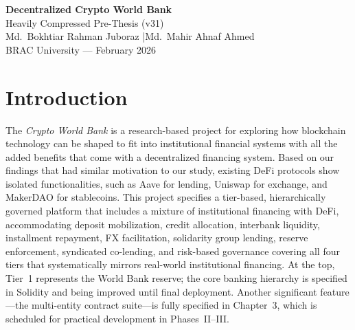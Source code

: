 \documentclass[12pt, a4paper]{report}
\begin{document}
\thispagestyle{empty}
\begin{center}
\vspace*{2cm}
{\LARGE\bfseries Decentralized Crypto World Bank}\\[0.5em]
{\large Heavily Compressed Pre-Thesis (v31)}\\[1.5em]
{\normalsize Md.\ Bokhtiar Rahman Juboraz \quad|\quad Md.\ Mahir Ahnaf Ahmed}\\[0.5em]
{\small BRAC University --- February 2026}
\end{center}
\newpage

\setcounter{page}{1}
\tableofcontents
\newpage
\listoffigures
\newpage
{}
\setcounter{page}{1}

\chapter{Introduction}
\label{sec:intro}

The \textit{Crypto World Bank} is a research-based project for exploring how blockchain technology can be shaped to fit into institutional financial systems with all the added benefits that come with a decentralized financing system. Based on our findings that had similar motivation to our study, existing DeFi protocols show isolated functionalities, such as Aave for lending, Uniswap for exchange, and MakerDAO for stablecoins. This project specifies a tier-based, hierarchically governed platform that includes a mixture of institutional financing with DeFi, accommodating deposit mobilization, credit allocation, interbank liquidity, installment repayment, FX facilitation, solidarity group lending, reserve enforcement, syndicated co-lending, and risk-based governance covering all four tiers that systematically mirrors real-world institutional financing. At the top, Tier~1 represents the World Bank reserve; the core banking hierarchy is specified in Solidity and being improved until final deployment. Another significant feature---the multi-entity contract suite---is fully specified in Chapter~3, which is scheduled for practical development in Phases~II--III.
\end{document}
